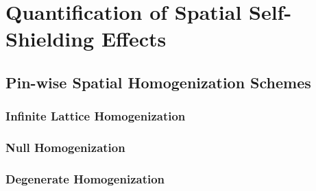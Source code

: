 \chapter{Quantification of Spatial Self-Shielding Effects}
\label{chap:quantify}

\section{Pin-wise Spatial Homogenization Schemes}
\label{sec:chap8-pinwise-space-homogenize}

\subsection{Infinite Lattice Homogenization}

\subsection{Null Homogenization}

\subsection{Degenerate Homogenization}

